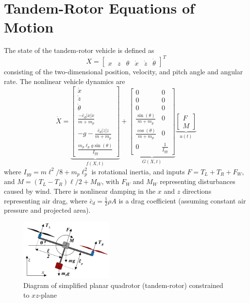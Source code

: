 \documentclass[letterpaper, 10 pt, conference]{ieeeconf}\usepackage[margin=1in]{geometry}
\begin{document}
\section{Tandem-Rotor Equations of Motion}
The state of the tandem-rotor vehicle is defined as
\begin{equation}
	X = \begin{bmatrix}
		x & z & \theta & \dot x & \dot z & \dot \theta
	\end{bmatrix}^T
\end{equation}
consisting of the two-dimensional position, velocity, and pitch angle and angular rate. The nonlinear vehicle dynamics are
\begin{equation}
	\dot X = \underbrace{\begin{bmatrix}
		\dot x \\ \dot z \\ \dot \theta \\ \frac{-\bar{c}_d |\dot x|\dot x}{m+m_p} \\ -g -\frac{\bar{c}_d |\dot z|\dot z}{m+m_p} \\ \frac{m_p \ell_p g \sin(\theta)}{I_{yy}}
	\end{bmatrix}}_{f(X,t)} + \underbrace{\begin{bmatrix}
		0 & 0 \\ 0 & 0 \\ 0 & 0 \\ \frac{\sin(\theta)}{m+m_p} & 0 \\
		\frac{\cos(\theta)}{m+m_p} & 0 \\ 0 & \frac{1}{I_{yy}}
	\end{bmatrix}}_{G(X,t)} \underbrace{\begin{bmatrix}
		F \\ M
	\end{bmatrix}}_{u(t)}
	\label{nonlin_dynamics}
\end{equation}
\noindent where $I_{yy} = m\ell^2/8+m_p \ell_p^2$ is rotational inertia, and inputs $F = T_L + T_R + F_W$, and $M = (T_L - T_R)\ell/2 + M_W$, with $F_W$ and $M_W$ representing disturbances caused by wind. There is nonlinear damping in the $x$ and $z$ directions representing air drag, where $\bar{c}_d = \frac{1}{2}\rho A$ is a drag coefficient (assuming constant air pressure and projected area).

\begin{figure}
	\centering
	\includegraphics[width=0.42\textwidth]{tandem_rotor}
	\caption{Diagram of simplified planar quadrotor (tandem-rotor) constrained to $xz$-plane}
\end{figure}
\end{document}
